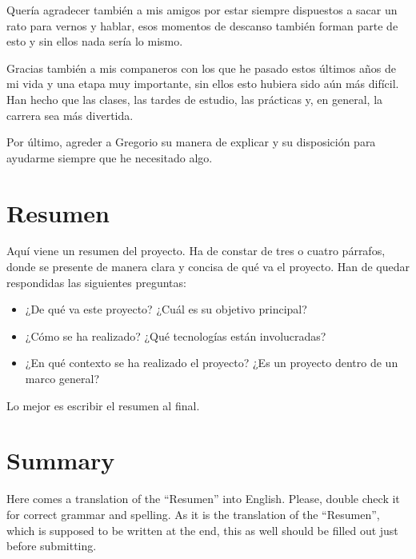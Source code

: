 \documentclass[a4paper, 12pt]{book}
\begin{document}
Quería agradecer también a mis amigos por estar siempre dispuestos a sacar un rato para vernos y hablar, esos momentos de descanso también forman parte de esto y sin ellos nada sería lo mismo.

Gracias también a mis companeros con los que he pasado estos últimos años de mi vida y una etapa muy importante, sin ellos esto hubiera sido aún más difícil. Han hecho que las clases, las tardes de estudio, las prácticas y, en general, la carrera sea más divertida.

Por último, agreder a Gregorio su manera de explicar y su disposición para ayudarme siempre que he necesitado algo.



\chapter*{Resumen}

Aquí viene un resumen del proyecto.
Ha de constar de tres o cuatro párrafos, donde se presente de manera clara y concisa de qué va el proyecto. 
Han de quedar respondidas las siguientes preguntas:

\begin{itemize}
  \item ¿De qué va este proyecto? ¿Cuál es su objetivo principal?
  \item ¿Cómo se ha realizado? ¿Qué tecnologías están involucradas?
  \item ¿En qué contexto se ha realizado el proyecto? ¿Es un proyecto dentro de un marco general?
\end{itemize}

Lo mejor es escribir el resumen al final.


\chapter*{Summary}

Here comes a translation of the ``Resumen'' into English. 
Please, double check it for correct grammar and spelling.
As it is the translation of the ``Resumen'', which is supposed to be written at the end, this as well should be filled out just before submitting.
\end{document}
